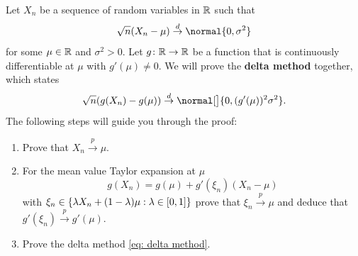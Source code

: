 \begin{exercise}[subtitle={Delta method \Coffeecup}]
    \label{ex: delta method}
    Let \(X_n\) be a sequence of random variables in \(\mathbb{R}\) such that
    \[
        \sqrt{n}(X_n - \mu) \overset{d}\to \normal{0, \sigma^2}
    \]
    for some \(\mu\in \mathbb{R}\) and \(\sigma^2 > 0\). Let \(g\colon\mathbb{R}\to\mathbb{R}\)
    be a function that is continuously differentiable at \(\mu\) with \(g'(\mu)\neq 0\).
    We will prove the \textbf{delta method} together, which states
    \begin{equation}
        \label{eq: delta method}    
        \sqrt{n}(g(X_n) - g(\mu)) \overset{d}\to \normal[\big]{0, (g'(\mu))^2\sigma^2}.
    \end{equation}
    The following steps will guide you through the proof:
    \begin{enumerate}[label=(\alph*), noitemsep]
        \item\label{it: (delta-method) X_n to mu} Prove that \(X_n \overset{p}\to \mu\).
        \item\label{it: (delta-method) taylor expansion} For the mean value Taylor expansion at \(\mu\)
        \[
            g(X_n) = g(\mu) + g'(\xi_n)(X_n - \mu)
        \]
        with \(\xi_n \in \{\lambda X_n + (1-\lambda)\mu : \lambda \in [0,1]\}\)
        prove that \(\xi_n \overset{p}\to \mu\) and deduce that \(g'(\xi_n) \overset{p}\to g'(\mu)\).
        \item\label{it: (delta-method) proof} Prove the delta method \eqref{eq: delta method}.
    \end{enumerate}
\end{exercise}
